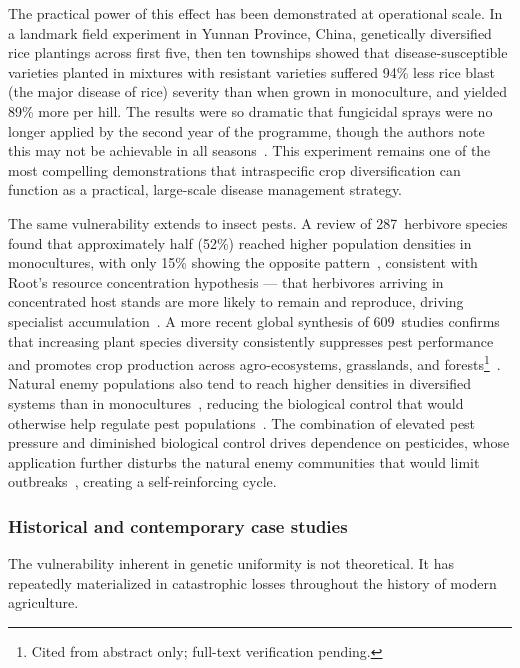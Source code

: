 The practical power of this effect has been demonstrated at operational scale. In a landmark field experiment in Yunnan Province, China, genetically diversified rice plantings across first five, then ten townships showed that disease-susceptible varieties planted in mixtures with resistant varieties suffered 94\% less rice blast (the major disease of rice) severity than when grown in monoculture, and yielded 89\% more per hill. The results were so dramatic that fungicidal sprays were no longer applied by the second year of the programme, though the authors note this may not be achievable in all seasons~\cite[pp.~718--721, Table~1]{zhu2000genetic}. This experiment remains one of the most compelling demonstrations that intraspecific crop diversification can function as a practical, large-scale disease management strategy.


The same vulnerability extends to insect pests. A review of
287~herbivore species found that approximately half (52\%) reached higher
population densities in monocultures, with only 15\% showing the opposite pattern~\cite[Table~1, pp.~566--567]{andow1991}, consistent with Root's resource concentration hypothesis --- that herbivores arriving in concentrated host stands are more likely to remain and reproduce, driving specialist accumulation~\cite[p.~116]{root1973collards}. A more recent global synthesis of 609~studies confirms that increasing plant species diversity consistently suppresses pest performance and promotes crop production across agro-ecosystems, grasslands, and forests\footnote{Cited from abstract only; full-text verification pending.}~\cite{wan2025diversity}. Natural enemy populations also tend to reach higher densities in diversified
systems than in monocultures~\cite[Table~1, p.~567]{andow1991}, reducing the biological
control that would otherwise help regulate pest
populations~\cite[p.~975]{tooker2012}. The combination of elevated
pest pressure and diminished biological control drives dependence on
pesticides, whose application further disturbs the
natural enemy communities that would limit
outbreaks~\cite[pp.~975,~982]{tooker2012}, creating a self-reinforcing cycle.

\subsubsection{Historical and contemporary case studies}

The vulnerability inherent in genetic uniformity is not theoretical. It has repeatedly materialized in catastrophic losses throughout the history of modern agriculture.


